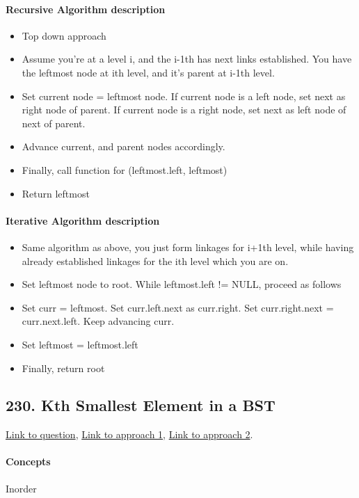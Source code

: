\documentclass[11pt]{book}
\begin{document}
\paragraph{Recursive Algorithm description}
\begin{itemize}
    \item Top down approach
    \item Assume you're at a level i, and the i-1th has next links established. You have the leftmost node at ith level, and it's parent at i-1th level.
    \item Set current node = leftmost node. If current node is a left node, set next as right node of parent. If current node is a right node, set next as left node of next of parent.
    \item Advance current, and parent nodes accordingly.
    \item Finally, call function for (leftmost.left, leftmost)
    \item Return leftmost
\end{itemize}
\paragraph{Iterative Algorithm description}
\begin{itemize}
    \item Same algorithm as above, you just form linkages for i+1th level, while having already established linkages for the ith level which you are on.
    \item Set leftmost node to root. While leftmost.left != NULL, proceed as follows
    \item Set curr = leftmost. Set curr.left.next as curr.right. Set curr.right.next = curr.next.left. Keep advancing curr.
    \item Set leftmost = leftmost.left
    \item Finally, return root
\end{itemize}

\subsection{230. Kth Smallest Element in a BST}
\href{https://leetcode.com/problems/kth-smallest-element-in-a-bst/}{Link to question},
\href{https://leetcode.com/submissions/detail/329744905/}{Link to approach 1},
\href{https://leetcode.com/submissions/detail/338352974/}{Link to approach 2}.
\paragraph{Concepts}
Inorder
\end{document}
